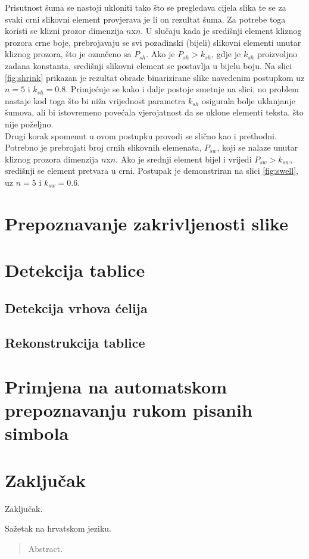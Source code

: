 \documentclass[times, utf8, zavrsni, numeric]{fer}
\begin{document}
Prisutnost šuma se nastoji ukloniti tako što se pregledava cijela slika te se za svaki crni slikovni element provjerava je li on rezultat šuma.
Za potrebe toga koristi se klizni prozor dimenzija $n$x$n$.
U slučaju kada je središnji element kliznog prozora crne boje, prebrojavaju se svi pozadinski (bijeli) slikovni elementi unutar kliznog prozora, što je označeno sa $P_{sh}$.
Ako je $P_{sh} > k_{sh}$, gdje je $k_{sh}$ proizvoljno zadana konstanta, središnji slikovni element se postavlja u bijelu boju.
Na slici \ref{fig:shrink} prikazan je rezultat obrade binarizirane slike navedenim postupkom uz $n = 5$ i $k_{sh} = 0.8$.
Primjećuje se kako i dalje postoje smetnje na slici, no problem nastaje kod toga što bi niža vrijednost parametra $k_{sh}$ osigurala bolje uklanjanje šumova, ali bi istovremeno povećala vjerojatnost da se uklone elementi teksta, što nije poželjno.\\

Drugi korak spomenut u ovom postupku provodi se slično kao i prethodni.
Potrebno je prebrojati broj crnih slikovnih elemenata, $P_{sw}$, koji se nalaze unutar kliznog prozora dimenzija $n$x$n$.
Ako je srednji element bijel i vrijedi $P_{sw} > k_{sw}$, središnji se element pretvara u crni.
Postupak je demonstriran na slici \ref{fig:swell}, uz $n = 5$ i $k_{sw} = 0.6$.


\chapter{Prepoznavanje zakrivljenosti slike}

\chapter{Detekcija tablice}
\section{Detekcija vrhova ćelija}
\section{Rekonstrukcija tablice}

\chapter{Primjena na automatskom prepoznavanju rukom pisanih simbola}

\chapter{Zaključak}
Zaključak.





\begin{sazetak}
Sažetak na hrvatskom jeziku.

\end{sazetak}

\begin{abstract}
Abstract.

\end{abstract}
\end{document}
